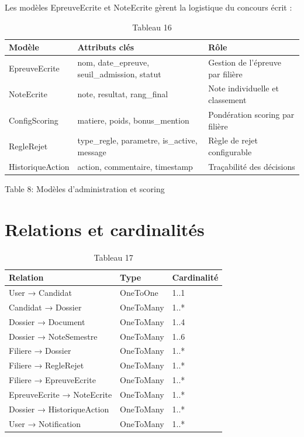 Les modèles EpreuveEcrite et NoteEcrite gèrent la logistique du concours écrit :

\begin{table}[htbp]
\centering
\begin{tabular}{|l|l|l|}
\hline
Modèle & Attributs clés & Rôle \\
\hline
EpreuveEcrite & nom, date\_epreuve, seuil\_admission, statut & Gestion de l'épreuve par filière \\
\hline
NoteEcrite & note, resultat, rang\_final & Note individuelle et classement \\
\hline
ConfigScoring & matiere, poids, bonus\_mention & Pondération scoring par filière \\
\hline
RegleRejet & type\_regle, parametre, is\_active, message & Règle de rejet configurable \\
\hline
HistoriqueAction & action, commentaire, timestamp & Traçabilité des décisions \\
\hline
\end{tabular}
\caption{Tableau 16}
\label{tab:table_16}
\end{table}

Table 8: Modèles d'administration et scoring

\section{Relations et cardinalités}

\begin{table}[htbp]
\centering
\begin{tabular}{|l|l|l|}
\hline
Relation & Type & Cardinalité \\
\hline
User → Candidat & OneToOne & 1..1 \\
\hline
Candidat → Dossier & OneToMany & 1..* \\
\hline
Dossier → Document & OneToMany & 1..4 \\
\hline
Dossier → NoteSemestre & OneToMany & 1..6 \\
\hline
Filiere → Dossier & OneToMany & 1..* \\
\hline
Filiere → RegleRejet & OneToMany & 1..* \\
\hline
Filiere → EpreuveEcrite & OneToMany & 1..* \\
\hline
EpreuveEcrite → NoteEcrite & OneToMany & 1..* \\
\hline
Dossier → HistoriqueAction & OneToMany & 1..* \\
\hline
User → Notification & OneToMany & 1..* \\
\hline
\end{tabular}
\caption{Tableau 17}
\label{tab:table_17}
\end{table}

